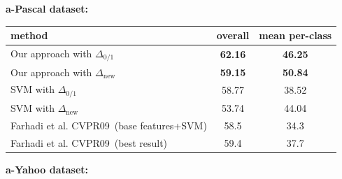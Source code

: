 \documentclass[a0]{a0poster}
\begin{document}
\begin{center}
{\vspace{2cm}

\begin{center}
{\Large\bf a-Pascal dataset:}
\end{center}


{\large
\begin{center}
\begin{tabular}{|l||c|c|}
\hline
method & overall & mean per-class\\
\hline\hline
Our approach with $\Delta_{0/1}$ & {\bf 62.16} & {\bf 46.25} \\
Our approach with $\Delta_{\mathrm{new}}$ & {\bf 59.15} & {\bf 50.84}\\
\hline
SVM with $\Delta_{0/1}$ & 58.77 & 38.52\\
SVM with $\Delta_{\mathrm{new}}$ & 53.74 & 44.04\\
\hline
Farhadi et al. CVPR09~(base features+SVM) & 58.5 & 34.3\\
\hline
Farhadi et al. CVPR09~(best result) & 59.4 & 37.7\\
\hline
\end{tabular}
\end{center}
}

\vspace{2cm}

\begin{center}
{\Large\bf a-Yahoo dataset:}
\end{center}

}
\end{center}
\end{document}
